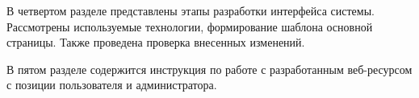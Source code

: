 В четвертом разделе представлены этапы разработки интерфейса системы.
Рассмотрены используемые технологии, формирование шаблона основной страницы.
Также проведена проверка внесенных изменений.

В пятом разделе содержится инструкция по работе с разработанным веб-ресурсом с позиции пользователя и администратора.

\clearpage
